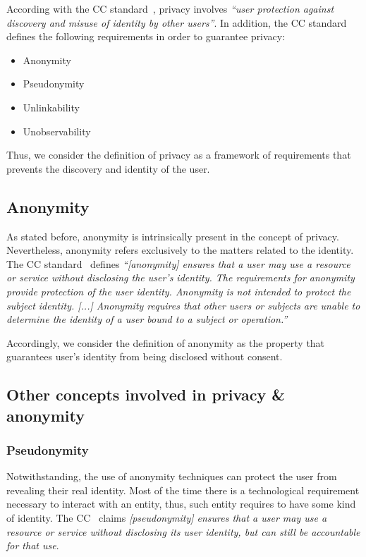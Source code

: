 \documentclass[conference]{IEEEtran}
\begin{document}
According with the CC standard~\cite{iso15408}, privacy involves
\textit{``user protection against discovery and misuse of identity by
other users''}. In addition, the CC standard~\cite{iso15408} defines the
following requirements in order to guarantee privacy:

\begin{itemize}
  \item Anonymity
  \item Pseudonymity
  \item Unlinkability
  \item Unobservability
\end{itemize}

Thus, we consider the definition of privacy as a framework of
requirements that prevents the discovery and identity of the user.

\subsection{Anonymity}

As stated before, anonymity is intrinsically present in the concept of
privacy. Nevertheless, anonymity refers exclusively to the matters
related to the identity. The CC standard~\cite{iso15408} defines
\textit{``[anonymity] ensures that a user may use a resource or service
  without disclosing the user’s identity. The requirements for anonymity
  provide protection of the user identity. Anonymity is not intended to
  protect the subject identity. [...] Anonymity requires that other
  users or subjects are unable to determine the identity of a user bound
  to a subject or operation.''}~\cite{iso15408}~\cite{anon_terminology}

Accordingly, we consider the definition of anonymity as the property
that guarantees user's identity from being disclosed without consent.

\subsection{Other concepts involved in privacy \& anonymity}

\subsubsection{Pseudonymity}

Notwithstanding, the use of anonymity techniques can protect the user
from revealing their real identity. Most of the time there is a
technological requirement necessary to interact with an entity, thus,
such entity requires to have some kind of identity. The CC~\cite{iso15408}
claims \textit{[pseudonymity] ensures that a user may use a resource or service without disclosing its user identity, but can still
be accountable for that use}.
\end{document}
